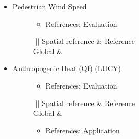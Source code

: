 \documentclass[letterpaper,10pt,english]{sphinxmanual}
\begin{document}
\begin{itemize}
\begin{description}
\end{description}

\item {} \begin{description}
\item[{Pedestrian Wind Speed}] \leavevmode\begin{itemize}
\item {} 
References: Evaluation

\end{itemize}


\begin{savenotes}\sphinxattablestart
\centering
\begin{tabular}[t]{|||}
\hline
\sphinxstyletheadfamily 
Spatial reference
&\sphinxstyletheadfamily 
Reference
\\
\hline
Global
&
\\
\hline
\end{tabular}
\par
\sphinxattableend\end{savenotes}

\end{description}

\item {} \begin{description}
\item[{Anthropogenic Heat (Qf) (LUCY)}] \leavevmode\begin{itemize}
\item {} 
References: Evaluation

\end{itemize}


\begin{savenotes}\sphinxattablestart
\centering
\begin{tabular}[t]{|||}
\hline
\sphinxstyletheadfamily 
Spatial reference
&\sphinxstyletheadfamily 
Reference
\\
\hline
Global
&
\\
\hline
\end{tabular}
\par
\sphinxattableend\end{savenotes}
\begin{itemize}
\item {} 
References: Application


\end{itemize}
\end{description}
\end{itemize}
\end{document}
